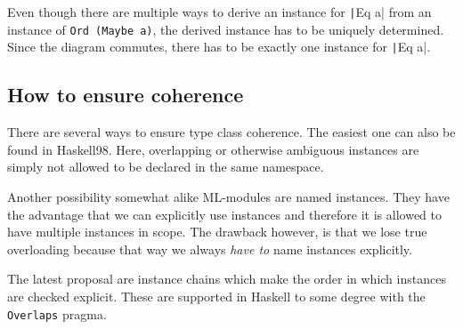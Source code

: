 
Even though there are multiple ways to derive an instance for \texttt|Eq a| from an instance of \texttt{Ord (Maybe a)}, the derived instance has to be uniquely determined.
Since the diagram commutes, there has to be exactly one instance for \texttt|Eq a|.

\subsection{How to ensure coherence}

There are several ways to ensure type class coherence.
The easiest one can also be found in Haskell98.
Here, overlapping or otherwise ambiguous instances are simply not allowed to be declared in the same namespace.

Another possibility somewhat alike ML-modules are named instances.
They have the advantage that we can explicitly use instances and therefore it is allowed to have multiple instances in scope.
The drawback however, is that we lose true overloading because that way we always \emph{have to} name instances explicitly.

The latest proposal are instance chains which make the order in which instances are checked explicit. \cite{morris2010instance}
These are supported in Haskell to some degree with the \texttt{Overlaps} pragma.
